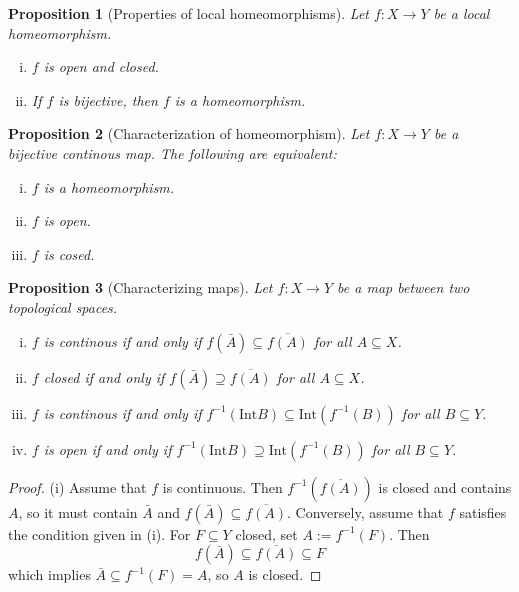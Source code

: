 \documentclass[a4paper,12pt,parskip=half*,chapterprefix=true,numbers=noendperiod]{scrreprt}
\newtheorem{proposition}{Proposition}[section]
\theoremstyle{definition}
\theoremstyle{remark}
\begin{document}
\begin{proposition}[Properties of local homeomorphisms]
	Let $f:X\to Y$ be a local homeomorphism.
	\begin{enumerate}[(i)]
		\item $f$ is open and closed.
		\item If $f$ is bijective, then $f$ is a homeomorphism.
	\end{enumerate}
\end{proposition}

\begin{proposition}[Characterization of homeomorphism]
	Let $f:X\to Y$ be a bijective continous map. The following are equivalent:
	\begin{enumerate}[(i)]
		\item $f$ is a homeomorphism.
		\item $f$ is open.
		\item $f$ is cosed.
	\end{enumerate}
\end{proposition}

\begin{proposition}[Characterizing maps]
	Let $f:X\to Y$ be a map between two topological spaces.
	\begin{enumerate}[(i)]
		\item $f$ is continous if and only if $f(\bar{A})\subseteq \overline{f(A)}$ for all $A\subseteq X$.
		\item $f$ closed if and only if $f(\bar{A})\supseteq \overline{f(A)}$ for all $A\subseteq X$.
		\item $f$ is continous if and only if $f^{-1}(\text{Int}B)\subseteq \text{Int}(f^{-1}(B))$ for all $B\subseteq Y$.
		\item $f$ is open if and only if $f^{-1}(\text{Int}B)\supseteq \text{Int}(f^{-1}(B))$ for all $B\subseteq Y$.
	\end{enumerate}
\end{proposition}

\begin{proof}
(i) Assume that $f$ is continuous. Then $f^{-1}(\overline{f(A)})$ is closed and contains $A$, so it must contain $\bar{A}$ and $f(\bar{A})\subseteq \overline{f(A)}$. Conversely, assume that $f$ satisfies the condition given in (i). For $F\subseteq Y$ closed, set $A:=f^{-1}(F)$. Then
\begin{equation*}
	f(\bar{A})\subseteq\overline{f(A)}\subseteq F
\end{equation*}
which implies $\bar{A}\subseteq f^{-1}(F)=A$, so $A$ is closed.
\end{proof}
\end{document}
